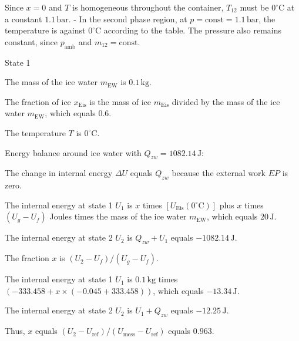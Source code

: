 Since \(x = 0\) and \(T\) is homogeneous throughout the container, \(T_{12}\) must be \(0^\circ \text{C}\) at a constant \(1.1 \, \text{bar}\).
- In the second phase region, at \(p = \text{const} = 1.1 \, \text{bar}\), the temperature is against \(0^\circ \text{C}\) according to the table.
The pressure also remains constant, since \(p_{\text{amb}}\) and \(m_{12} = \text{const}\).

State 1

The mass of the ice water \(m_{\text{EW}}\) is \(0.1 \, \text{kg}\).

The fraction of ice \(x_{\text{Eis}}\) is the mass of ice \(m_{\text{Eis}}\) divided by the mass of the ice water \(m_{\text{EW}}\), which equals \(0.6\).

The temperature \(T\) is \(0^\circ \text{C}\).

Energy balance around ice water with \(Q_{zw} = 1082.14 \, \text{J}\):

The change in internal energy \(\Delta U\) equals \(Q_{zw}\) because the external work \(EP\) is zero.

The internal energy at state 1 \(U_1\) is \(x\) times \([U_{\text{Eis}}(0^\circ \text{C})]\) plus \(x\) times \((U_g - U_f)\) Joules times the mass of the ice water \(m_{\text{EW}}\), which equals \(20 \, \text{J}\).

The internal energy at state 2 \(U_2\) is \(Q_{zw} + U_1\) equals \(-1082.14 \, \text{J}\).

The fraction \(x\) is \((U_2 - U_f) / (U_g - U_f)\).

The internal energy at state 1 \(U_1\) is \(0.1 \, \text{kg}\) times \((-333.458 + x \times (-0.045 + 333.458))\), which equals \(-13.34 \, \text{J}\).

The internal energy at state 2 \(U_2\) is \(U_1 + Q_{zw}\) equals \(-12.25 \, \text{J}\).

Thus, \(x\) equals \((U_2 - U_{\text{ref}}) / (U_{\text{mess}} - U_{\text{ref}})\) equals \(0.963\).
